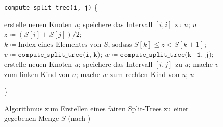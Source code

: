\begin{figure}[b]
	\centering
	\begin{minipage}{.8\linewidth}
		\scriptsize
		\begin{algorithmic}[H]
			\STATE \texttt{compute\_split\_tree(i, j)}  \{
			\begin{ALC@g}
					\STATE erstelle neuen Knoten $u$;
					\STATE speichere das Intervall $[i,i]$ zu $u$;
					\RETURN $u$
				\ELSE
					\STATE $z \coloneqq (S[i] + S[j]) / 2$;
					\STATE $k \coloneqq \text{Index eines Elementes von } S \text{, sodass } S[k] \leq z < S[k+1]$;
					\STATE $v \coloneqq \texttt{compute\_split\_tree(i, k)}$;
					\STATE $w \coloneqq \texttt{compute\_split\_tree(k+1, j)}$;
					\STATE erstelle neuen Knoten $u$;
					\STATE speichere das Intervall $[i, j]$ zu $u$;
					\STATE mache $v$ zum linken Kind von $u$;
					\STATE mache $w$ zum rechten Kind von $u$;
					\RETURN $u$
				\ENDIF
			\end{ALC@g}
			\STATE \}
		\end{algorithmic}
	\end{minipage}
	\caption{Algorithmus zum Erstellen eines fairen Split-Trees zu einer gegebenen Menge $S$ (nach \cite{gudmundsson})}
	\label{fig:splittree}
\end{figure}

